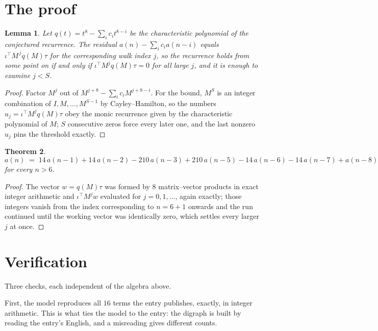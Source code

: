 \documentclass[11pt,a4paper]{article}
\theoremstyle{plain}
\newtheorem{theorem}{Theorem}
\newtheorem{lemma}[theorem]{Lemma}
\theoremstyle{definition}
\begin{document}
\section{The proof}

\begin{lemma}\label{lem:crit}
Let $q(t)=t^{8}-\sum_i c_it^{8-i}$ be the characteristic polynomial of the
conjectured recurrence. The residual $a(n)-\sum_ic_ia(n-i)$ equals
$\iota^{\!\top}M^{\,j}q(M)\tau$ for the corresponding walk index $j$, so the recurrence
holds from some point on if and only if $\iota^{\!\top}M^{j}q(M)\tau=0$ for all large $j$,
and it is enough to examine $j<S$.
\end{lemma}

\begin{proof}
Factor $M^{j}$ out of $M^{j+8}-\sum_ic_iM^{j+8-i}$. For the bound, $M^{S}$
is an integer combination of $I,M,\dots,M^{S-1}$ by Cayley--Hamilton, so the numbers
$u_j=\iota^{\!\top}M^{j}q(M)\tau$ obey the monic recurrence given by the characteristic
polynomial of $M$; $S$ consecutive zeros force every later one, and the last nonzero $u_j$
pins the threshold exactly.
\end{proof}

\begin{theorem}
\[
a(n)\;=\;14\,a(n-1) + 14\,a(n-2) - 210\,a(n-3) + 210\,a(n-5) - 14\,a(n-6) - 14\,a(n-7) + a(n-8)
\]
for every $n>6$.
\end{theorem}

\begin{proof}
The vector $w=q(M)\tau$ was formed by $8$ matrix--vector products in exact integer
arithmetic and $\iota^{\!\top}M^{j}w$ evaluated for $j=0,1,\dots$, again exactly; those
integers vanish from the index corresponding to $n=6+1$ onwards and the run continued
until the working vector was identically zero, which settles every larger $j$ at once.
\end{proof}

\section{Verification}

Three checks, each independent of the algebra above.

First, the model reproduces all $16$ terms the entry publishes, exactly, in integer
arithmetic. This is what ties the model to the entry: the digraph is built by reading the
entry's English, and a misreading gives different counts.
\end{document}
